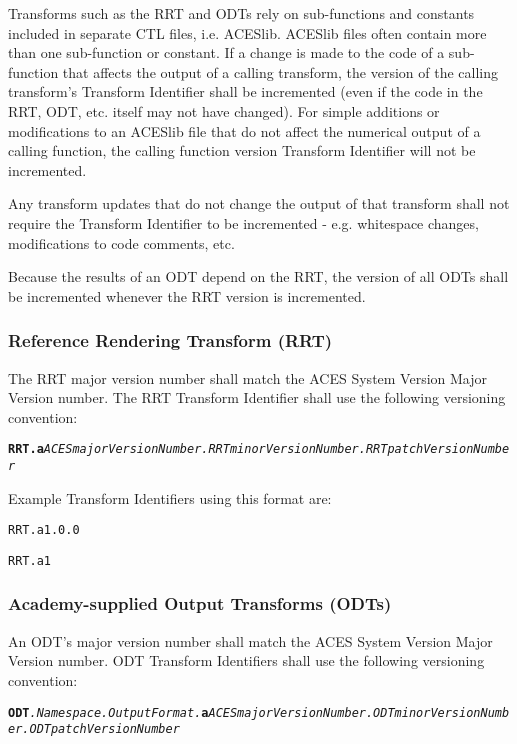 Transforms such as the RRT and ODTs rely on sub-functions and constants included in separate CTL files, i.e. ACESlib. ACESlib files often contain more than one sub-function or constant. If a change is made to the code of a sub-function that affects the output of a calling transform, the version of the calling transform's Transform Identifier shall be incremented (even if the code in the RRT, ODT, etc. itself may not have changed). For simple additions or modifications to an ACESlib file that do not affect the numerical output of a calling function, the calling function version Transform Identifier will not be incremented. 

Any transform updates that do not change the output of that transform shall not require the Transform Identifier to be incremented - e.g. whitespace changes, modifications to code comments, etc.

Because the results of an ODT depend on the RRT, the version of all ODTs shall be incremented whenever the RRT version is incremented.

\subsubsection{Reference Rendering Transform (RRT)}
The RRT major version number shall match the ACES System Version Major Version number. The RRT Transform Identifier shall use the following versioning convention:

\texttt{\textbf{RRT.a}\textit{ACESmajorVersionNumber.RRTminorVersionNumber.RRTpatchVersionNumber}}

Example Transform Identifiers using this format are: 
\begin{listize}
	\item \texttt{RRT.a1.0.0}
	\item \texttt{RRT.a1}
\end{listize}

\subsubsection{Academy-supplied Output Transforms (ODTs)}
An ODT's major version number shall match the ACES System Version Major Version number. ODT Transform Identifiers shall use the following versioning convention:

\begin{sloppypar}
\texttt{\textbf{ODT}\textit{.Namespace.OutputFormat.\-}\textbf{a}\textit{ACESmajorVersionNumber.\-ODTminor\-Version\-Number.ODTpatchVersion\-Number}}
\end{sloppypar}

